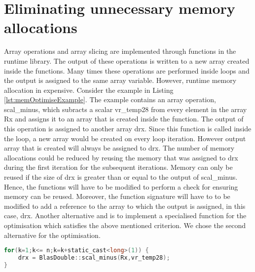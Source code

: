 \section{Eliminating unnecessary memory allocations}
\label{sec:memoptimise}
Array operations and array slicing are implemented through functions in the runtime library. The output of these operations is written to a new array created inside the functions. Many times these operations are performed inside loops and the output is assigned to the same array variable. However, runtime memory allocation in expensive. Consider the example in Listing \ref{lst:memOptimiseExample}. The example contains an array operation, scal\_minus, which subracts a scalar vr\_temp28  from every element in the array Rx and assigns it to an array that is created inside the function. The output of this operation is assigned to another array drx. Since this function is called inside the loop, a new array would be created on every loop iteration. However output array that is created will always be assigned to drx. The number of memory allocations could be reduced by reusing the memory that was assigned to drx during the first iteration for the subsequent iterations. Memory can only be reused if the size of drx is greater than or equal to the output of scal\_minus. Hence, the functions will have to be modified to perform a check for ensuring memory can be reused. Moreover, the function signature will have to to be modified to add a reference to the array to which the output is assigned, in this case, drx. Another alternative and is to implement a specialised function for the optimisation which satisfies the above mentioned criterion. We chose the second alternative for the optimisation. 
\begin{lstlisting}[float,language=c,caption={An example of an array operation which is optimised },label={lst:memOptimiseExample}]
for(k=1;k<= n;k=k+static_cast<long>(1)) {
	drx = BlasDouble::scal_minus(Rx,vr_temp28);
}
\end{lstlisting}

